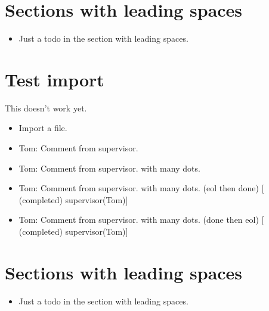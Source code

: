 \chapter{Sections with leading spaces}
\label{autosec:9}
    \begin{itemize}[noitemsep]
        \item {\color{red}Just a todo in the section with leading spaces.}
    \end{itemize}
\chapter{Test import}
\label{autosec:10}
This doesn't work yet.
    \begin{itemize}[noitemsep]
        \item {\color{red}Import a file.}
        \item {\color{WildStrawberry}Tom: Comment from supervisor.}
        \item {\color{WildStrawberry}Tom: Comment from supervisor. with many dots.}
        \item {\color{Gray}Tom: Comment from supervisor. with many dots. (eol then done) [ (completed) supervisor(Tom)]}
        \item {\color{Gray}Tom: Comment from supervisor. with many dots. (done then eol) [ (completed) supervisor(Tom)]}
    \end{itemize}
\chapter{Sections with leading spaces}
\label{autosec:11}
    \begin{itemize}[noitemsep]
        \item {\color{red}Just a todo in the section with leading spaces.}
    \end{itemize}
